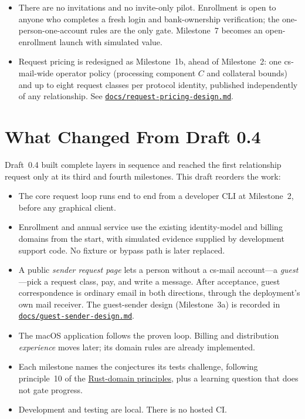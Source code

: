 \documentclass[11pt]{article}
\begin{document}
\begin{itemize}
    \item There are no invitations and no invite-only pilot. Enrollment is open
    to anyone who completes a fresh login and bank-ownership verification; the
    one-person-one-account rules are the only gate. Milestone~7 becomes an
    open-enrollment launch with simulated value.
    \item Request pricing is redesigned as Milestone~1b, ahead of Milestone~2: one
    cs-mail-wide operator policy (processing component $C$ and collateral bounds)
    and up to eight request classes per protocol identity, published
    independently of any relationship. See
    \href{docs/request-pricing-design.md}{\texttt{docs/request-pricing-design.md}}.
\end{itemize}

\section{What Changed From Draft 0.4}

Draft~0.4 built complete layers in sequence and reached the first relationship
request only at its third and fourth milestones. This draft reorders the work:

\begin{itemize}
    \item The core request loop runs end to end from a developer CLI at
    Milestone~2, before any graphical client.
    \item Enrollment and annual service use the existing identity-model and
    billing domains from the start, with simulated evidence supplied by
    development support code. No fixture or bypass path is later replaced.
    \item A public \emph{sender request page} lets a person without a cs-mail
    account---a \emph{guest}---pick a request class, pay, and write a message.
    After acceptance, guest correspondence is ordinary email in both directions,
    through the deployment's own mail receiver. The guest-sender design
    (Milestone~3a) is recorded in
    \href{docs/guest-sender-design.md}{\texttt{docs/guest-sender-design.md}}.
    \item The macOS application follows the proven loop. Billing and distribution
    \emph{experience} moves later; its domain rules are already implemented.
    \item Each milestone names the conjectures its tests challenge, following
    principle~10 of the \href{docs/rust-domain-principles.md}{Rust-domain
    principles}, plus a learning question that does not gate progress.
    \item Development and testing are local. There is no hosted CI.
\end{itemize}
\end{document}
